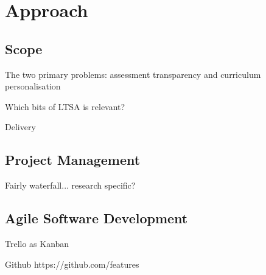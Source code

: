 \chapter{Approach}

\section{Scope}

The two primary problems: assessment transparency and curriculum personalisation

Which bits of LTSA is relevant?

Delivery

\section{Project Management}

Fairly waterfall... research specific?

\section{Agile Software Development}

Trello as Kanban

Github
https://github.com/features


